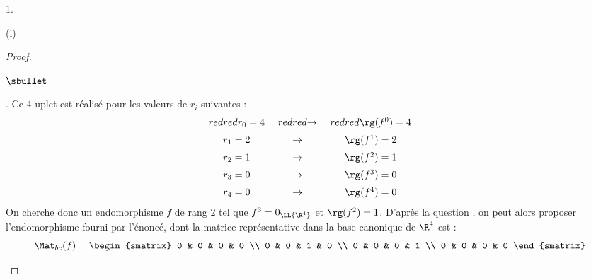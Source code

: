 \begin{noliste}{1.}
\begin{noliste}{(i)}
\begin{proof}
\begin{noliste}{$\sbullet$}
          \newpage


        \item {}. Ce
          $4$-uplet est réalisé pour les valeurs de $r_i$ suivantes :
          \[
          \begin{array}{c@{\ \quad}c@{\ \quad}c}
            \color{red}{r_0 = 4} & \color{red}{\rightarrow} &
            \color{red}{\rg(f^0) = 4} \\[.2cm] 
            r_1 = 2 & \rightarrow & \rg(f^1) = 2 \\[.2cm]
            r_2 = 1 & \rightarrow & \rg(f^2) = 1 \\[.2cm]
            r_3 = 0 & \rightarrow & \rg(f^3) = 0 \\[.2cm]
            r_4 = 0 & \rightarrow & \rg(f^4) = 0 
          \end{array}
          \]
          On cherche donc un endomorphisme $f$ de rang $2$ tel que
          $f^3 = 0_{\LL{\R^4}}$ et $\rg(f^2) = 1$. D'après la question
          , on peut alors proposer l'endomorphisme fourni par
          l'énoncé, dont la matrice représentative dans la base
          canonique de $\R^4$ est :
          \[
          \Mat_{bc}(f) =
          \begin{smatrix}
            0 & 0 & 0 & 0 \\
            0 & 0 & 1 & 0 \\
            0 & 0 & 0 & 1 \\
            0 & 0 & 0 & 0 
          \end{smatrix}
          \]


\end{noliste}
\end{proof}
\end{noliste}
\end{noliste}
